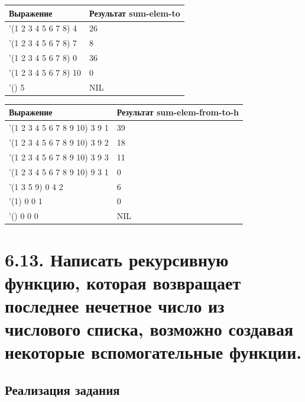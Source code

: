\documentclass[a4paper,12pt]{article}
\begin{document}
 	\begin{table} [h!]
 		\begin{center}
 			\begin{tabular}{|l|l|}
 				\hline
 				{\bf  Выражение} & {\bf Результат sum-elem-to} \\
 				\hline
 				{'(1 2 3 4 5 6 7 8) 4} & 26\\
 				\hline
 				{'(1 2 3 4 5 6 7 8) 7} & 8\\
 				\hline
 				{'(1 2 3 4 5 6 7 8) 0} & 36\\
 				\hline
 				{'(1 2 3 4 5 6 7 8) 10} & 0\\
 				\hline
 				{'() 5} & NIL\\
 				\hline
 			\end{tabular}  
 			\label{m2}
 		\end{center}
 	\end{table}
 
 
 	\begin{table} [h!]
 		\begin{center}
 			\begin{tabular}{|l|l|}
 				\hline
 				{\bf  Выражение} & {\bf Результат sum-elem-from-to-h} \\
 				\hline
 				{'(1 2 3 4 5 6 7 8 9 10) 3 9 1} & 39\\
 				\hline
 				{'(1 2 3 4 5 6 7 8 9 10) 3 9 2} & 18\\
 				\hline
 				{'(1 2 3 4 5 6 7 8 9 10) 3 9 3} & 11\\
 				\hline
 				{'(1 2 3 4 5 6 7 8 9 10) 9 3 1} & 0\\
 				\hline
 				{'(1 3 5 9) 0 4 2} & 6\\
 				\hline
 				{'(1) 0 0 1} & 0\\
 				\hline
 				{'() 0 0 0} & NIL\\
 				\hline
 			\end{tabular}  
 			\label{m2}
 		\end{center}
 	\end{table}
 	
 	\newpage
 	
 	\section*{6.13. Написать рекурсивную функцию, которая возвращает последнее нечетное
число из числового списка, возможно создавая некоторые вспомогательные функции.
 	}
 	
 	\subsection*{Реализация задания}
 	
\end{document}
